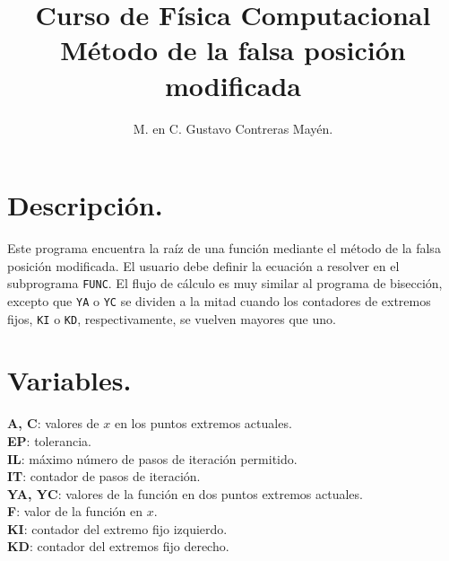 \documentclass[12pt]{article}
\author{M. en C. Gustavo Contreras Mayén.}
\title{Curso de Física Computacional \\ Método de la falsa posición modificada}
\date{ }
\begin{document}
\maketitle
\fontsize{14}{14}\selectfont
\section{Descripción.}
Este programa encuentra la raíz de una función mediante el método de la falsa posición modificada. 
El usuario debe definir la ecuación a resolver en el subprograma \texttt{FUNC}. El flujo de cálculo es muy similar al programa de bisección, excepto que \texttt{YA} o \texttt{YC} se dividen a la mitad cuando los contadores de extremos fijos, \texttt{KI} o \texttt{KD}, respectivamente, se vuelven mayores que uno.
\section{Variables.}
\textbf{A, C}: valores de $x$ en los puntos extremos actuales. \\
\textbf{EP}: tolerancia.\\
\textbf{IL}: máximo número de pasos de iteración permitido. \\
\textbf{IT}: contador de pasos de iteración.\\
\textbf{YA, YC}: valores de la función en dos puntos extremos actuales.\\
\textbf{F}: valor de la función en $x$. \\
\textbf{KI}: contador del extremo fijo izquierdo. \\
\textbf{KD}: contador del extremos fijo derecho.
\end{document}
